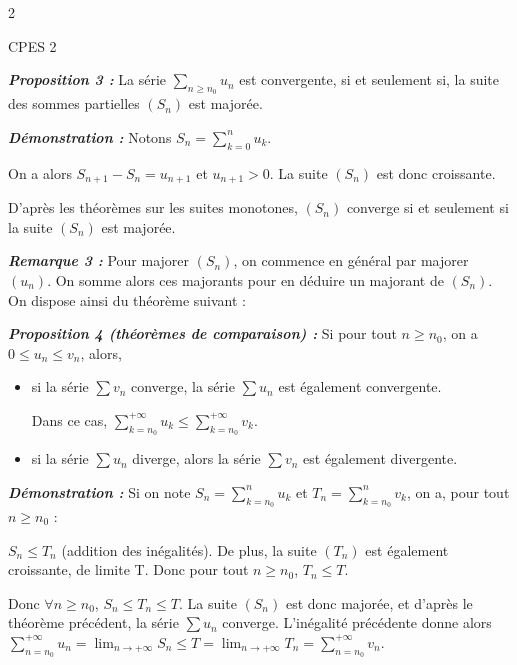 \documentclass[10pt,a4paper]{article}
\begin{document}
\newpage

\begin{multicols}{2}

\begin{flushright}
\footnotesize CPES 2
\end{flushright}
\vspace{-0.2cm}

\textbf{\textit{Proposition 3 :}} La série $\sum_{n \ge n_0} u_n$ est convergente, si et seulement si, la suite des sommes partielles $(S_n)$ est majorée.

\textbf{\textit{Démonstration :}} Notons $S_n = \sum_{k=0}^n u_k$.

On a alors $S_{n+1} - S_n = u_{n+1}$ et $u_{n+1} > 0$. La suite $(S_n)$ est donc croissante.

D'après les théorèmes sur les suites monotones, $(S_n)$ converge si et seulement si la suite $(S_n)$ est majorée.

\textbf{\textit{Remarque 3 :}} Pour majorer $(S_n)$, on commence en général par majorer $(u_n)$. On somme alors ces majorants pour en déduire un majorant de $(S_n)$. On dispose ainsi du théorème suivant :

\textbf{\textit{Proposition 4 (théorèmes de comparaison) :}} Si pour tout $n \ge n_0$, on a $0 \le u_n \le v_n$, alors,
\begin{itemize}
\item[\checkmark] si la série $\sum v_n$ converge, la série $\sum u_n$ est également convergente.

Dans ce cas, $\sum_{k=n_0}^{+\infty} u_k \le \sum_{k=n_0}^{+\infty} v_k$.
\item[\checkmark] si la série $\sum u_n$ diverge, alors la série $\sum v_n$ est également divergente.
\end{itemize}

\textbf{\textit{Démonstration :}} Si on note $S_n = \sum_{k=n_0}^n u_k$ et $T_n = \sum_{k=n_0}^n v_k$, on a, pour tout $n \ge n_0$ :

$S_n \le T_n$ (addition des inégalités). De plus, la suite $(T_n)$ est également croissante, de limite T. Donc pour tout $n \ge n_0$, $T_n \le T$.

Donc $\forall n \ge n_0$, $S_n \le T_n \le T$. La suite $(S_n)$ est donc majorée, et d'après le théorème précédent, la série $\sum u_n$ converge. L'inégalité précédente donne alors $\sum_{n=n_0}^{+\infty} u_n = \lim_{n \to +\infty} S_n \le T = \lim_{n \to +\infty} T_n = \sum_{n=n_0}^{+\infty} v_n$.


\end{multicols}
\end{document}
